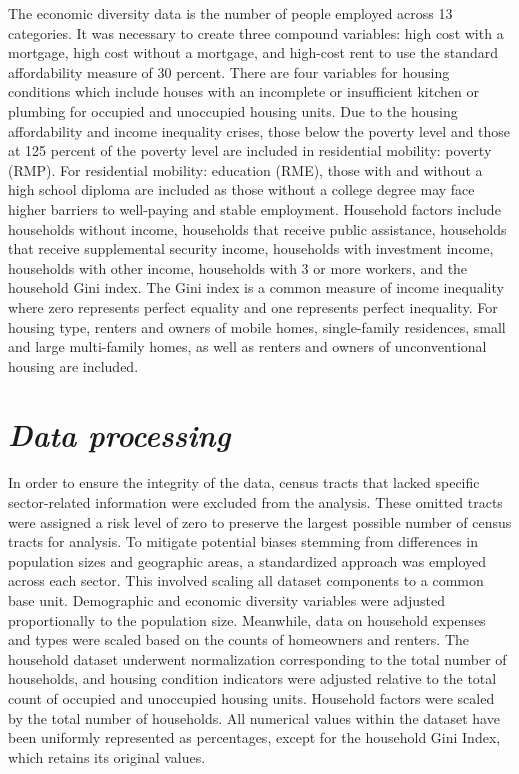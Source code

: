 The economic diversity data is the number of people employed across 13 categories. It was necessary to create three compound variables: high cost with a mortgage, high cost without a mortgage, and high-cost rent to use the standard affordability measure of 30 percent. There are four variables for housing conditions which include houses with an incomplete or insufficient kitchen or plumbing for occupied and unoccupied housing units.  Due to the housing affordability and income inequality crises, those below the poverty level and those at 125 percent of the poverty level are included in residential mobility: poverty (RMP). For residential mobility: education (RME), those with and without a high school diploma are included as those without a college degree may face higher barriers to well-paying and stable employment. Household factors include households without income, households that receive public assistance, households that receive supplemental security income, households with investment income, households with other income, households with 3 or more workers, and the household Gini index. The Gini index is a common measure of income inequality where zero represents perfect equality and one represents perfect inequality. For housing type,  renters and owners of mobile homes, single-family residences, small and large multi-family homes, as well as renters and owners of unconventional housing are included.



\section{\textit{Data processing}}
In order to ensure the integrity of the data, census tracts that lacked specific sector-related information were excluded from the analysis. These omitted tracts were assigned a risk level of zero to preserve the largest possible number of census tracts for analysis. To mitigate potential biases stemming from differences in population sizes and geographic areas, a standardized approach was employed across each sector. This involved scaling all dataset components to a common base unit. Demographic and economic diversity variables were adjusted proportionally to the population size. Meanwhile, data on household expenses and types were scaled based on the counts of homeowners and renters. The household dataset underwent normalization corresponding to the total number of households, and housing condition indicators were adjusted relative to the total count of occupied and unoccupied housing units. Household factors were scaled by the total number of households. All numerical values within the dataset have been uniformly represented as percentages, except for the household Gini Index, which retains its original values. 

